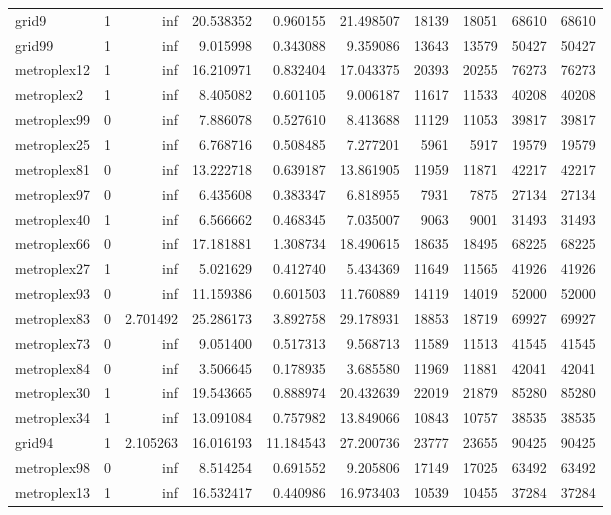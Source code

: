 \begin{longtable}{|l|r|r|r|r|r|r|r|r|r|}
grid9 & 1 & inf & 20.538352 & 0.960155 & 21.498507 & 18139 & 18051 & 68610 & 68610 \\
grid99 & 1 & inf & 9.015998 & 0.343088 & 9.359086 & 13643 & 13579 & 50427 & 50427 \\
metroplex12 & 1 & inf & 16.210971 & 0.832404 & 17.043375 & 20393 & 20255 & 76273 & 76273 \\
metroplex2 & 1 & inf & 8.405082 & 0.601105 & 9.006187 & 11617 & 11533 & 40208 & 40208 \\
metroplex99 & 0 & inf & 7.886078 & 0.527610 & 8.413688 & 11129 & 11053 & 39817 & 39817 \\
metroplex25 & 1 & inf & 6.768716 & 0.508485 & 7.277201 & 5961 & 5917 & 19579 & 19579 \\
metroplex81 & 0 & inf & 13.222718 & 0.639187 & 13.861905 & 11959 & 11871 & 42217 & 42217 \\
metroplex97 & 0 & inf & 6.435608 & 0.383347 & 6.818955 & 7931 & 7875 & 27134 & 27134 \\
metroplex40 & 1 & inf & 6.566662 & 0.468345 & 7.035007 & 9063 & 9001 & 31493 & 31493 \\
metroplex66 & 0 & inf & 17.181881 & 1.308734 & 18.490615 & 18635 & 18495 & 68225 & 68225 \\
metroplex27 & 1 & inf & 5.021629 & 0.412740 & 5.434369 & 11649 & 11565 & 41926 & 41926 \\
metroplex93 & 0 & inf & 11.159386 & 0.601503 & 11.760889 & 14119 & 14019 & 52000 & 52000 \\
metroplex83 & 0 & 2.701492 & 25.286173 & 3.892758 & 29.178931 & 18853 & 18719 & 69927 & 69927 \\
metroplex73 & 0 & inf & 9.051400 & 0.517313 & 9.568713 & 11589 & 11513 & 41545 & 41545 \\
metroplex84 & 0 & inf & 3.506645 & 0.178935 & 3.685580 & 11969 & 11881 & 42041 & 42041 \\
metroplex30 & 1 & inf & 19.543665 & 0.888974 & 20.432639 & 22019 & 21879 & 85280 & 85280 \\
metroplex34 & 1 & inf & 13.091084 & 0.757982 & 13.849066 & 10843 & 10757 & 38535 & 38535 \\
grid94 & 1 & 2.105263 & 16.016193 & 11.184543 & 27.200736 & 23777 & 23655 & 90425 & 90425 \\
metroplex98 & 0 & inf & 8.514254 & 0.691552 & 9.205806 & 17149 & 17025 & 63492 & 63492 \\
metroplex13 & 1 & inf & 16.532417 & 0.440986 & 16.973403 & 10539 & 10455 & 37284 & 37284 \\

\end{longtable}
